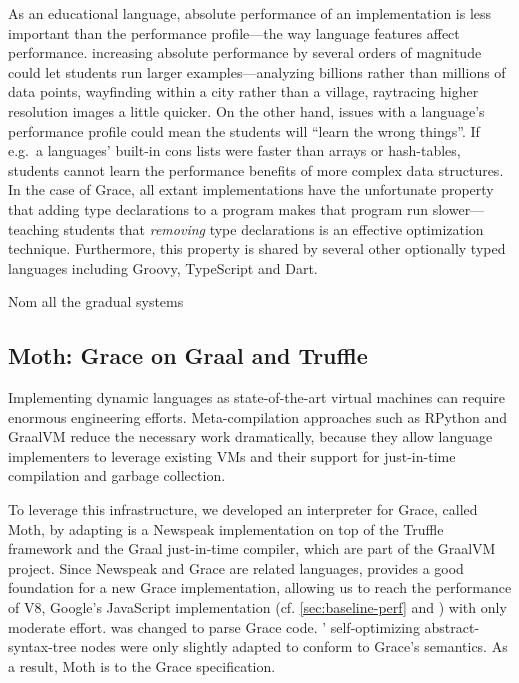 As an educational language\citep{panel}, absolute performance of an
implementation is less important than the performance profile---the
way language features affect performance.  increasing absolute
performance by several orders of magnitude could let students run
larger examples---analyzing billions rather than millions of data
points, wayfinding within a city rather than a village, raytracing
higher resolution images a little quicker.  On the other hand, issues
with a language's performance profile could mean the students will
``learn the wrong things''.  If e.g.\ a languages' built-in cons lists
were faster than arrays or hash-tables, students cannot learn the
performance benefits of more complex data structures. In the case of
Grace, all extant implementations have the unfortunate property that
adding type declarations to a program makes that program run slower---teaching students that \emph{removing} type declarations is an
effective optimization technique.
Furthermore, this property is shared
by several other optionally typed languages including Groovy,
TypeScript and Dart\citep{Muehlboeck2017}.
\begin{cnote}
Nom\citep{Muehlboeck2017}
all the gradual systems
\end{cnote}

\subsection{Moth: Grace on Graal and Truffle}
\label{ssec:moth}

Implementing dynamic languages as state-of-the-art virtual machines
can require enormous engineering efforts.
Meta-compilation approaches\citep{Marr:2015:MTPE}
such as RPython\citep{Bolz:2009:TMP,Bolz:2013:IMT}
and GraalVM\citep{Wurthinger2013,Wurthinger:2017:PPE}
reduce the necessary work dramatically,
because they allow language implementers to leverage existing VMs
and their support for just-in-time compilation and garbage collection.

To leverage this infrastructure, we developed an interpreter for Grace,
called Moth\citep{Roberts2017}, by adapting
\SOMns is a Newspeak implementation\citep{Bracha:10:NS} on top of the Truffle framework and the Graal just-in-time compiler,
which are part of the GraalVM project.
Since Newspeak and Grace are related languages,
\SOMns provides a good foundation for a new Grace implementation,
allowing us to reach the performance of V8,
Google's JavaScript implementation
(cf. \cref{sec:baseline-perf} and \citet{Marr2016})
with only moderate effort.
\SOMns was changed to parse Grace code.
\SOMns' self-optimizing abstract-syntax-tree nodes were only slightly adapted to conform to Grace's semantics.
As a result, Moth is  to the Grace specification.

